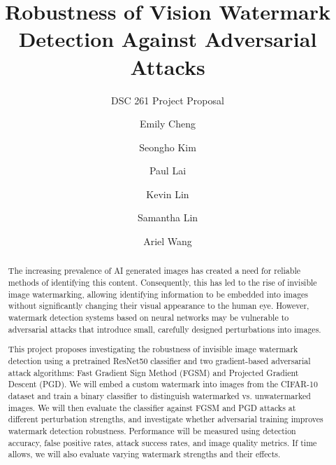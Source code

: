 \documentclass[sigconf, nonacm]{acmart}
\begin{document}
\title{Robustness of Vision Watermark Detection Against Adversarial Attacks}
\subtitle{DSC 261 Project Proposal}

\author{Emily Cheng}
\affiliation{
  \institution{}
  \city{}
  \state{}
  \country{}
}

\author{Seongho Kim}
\affiliation{
  \institution{}
  \city{}
  \state{}
  \country{}
}

\author{Paul Lai}
\affiliation{
  \institution{}
  \city{}
  \state{}
  \country{}
}

\author{Kevin Lin}
\affiliation{
  \institution{}
  \city{}
  \state{}
  \country{}
}

\author{Samantha Lin}
\affiliation{
  \institution{}
  \city{}
  \state{}
  \country{}
}

\author{Ariel Wang}
\affiliation{
  \institution{}
  \city{}
  \state{}
  \country{}
}

\begin{abstract}
The increasing prevalence of AI generated images has created a need for reliable methods of identifying this content. Consequently, this has led to the rise of invisible image watermarking, allowing identifying information to be embedded into images without significantly changing their visual appearance to the human eye. However, watermark detection systems based on neural networks may be vulnerable to adversarial attacks that introduce small, carefully designed perturbations into images.

This project proposes investigating the robustness of invisible image watermark detection using a pretrained ResNet50 classifier and two gradient-based adversarial attack algorithms: Fast Gradient Sign Method (FGSM) and Projected Gradient Descent (PGD). We will embed a custom watermark into images from the CIFAR-10 dataset and train a binary classifier to distinguish watermarked vs. unwatermarked images. We will then evaluate the classifier against FGSM and PGD attacks at different perturbation strengths, and investigate whether adversarial training improves watermark detection robustness. Performance will be measured using detection accuracy, false positive rates, attack success rates, and image quality metrics. If time allows, we will also evaluate varying watermark strengths and their effects.
\end{abstract}
\end{document}
